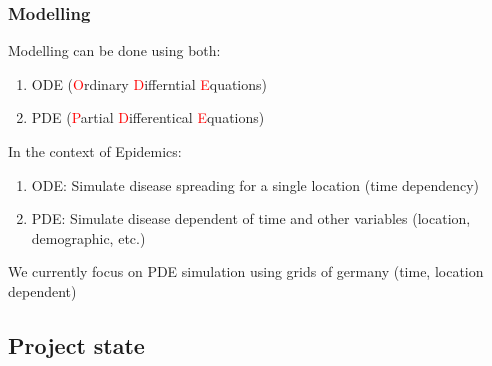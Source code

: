 \documentclass{beamer}
\begin{document}
\begin{frame}
\end{frame}

\begin{frame}
	\frametitle{Modelling}
	Modelling can be done using both:
	\begin{enumerate}[$\bullet$]
		\item ODE (\textcolor{red}{O}rdinary \textcolor{red}{D}ifferntial \textcolor{red}{E}quations)
		\item PDE (\textcolor{red}{P}artial \textcolor{red}{D}ifferentical \textcolor{red}{E}quations)
	\end{enumerate}
	\textit{ }\newline
	In the context of Epidemics:
	\begin{enumerate}[$\bullet$]
		\item ODE: Simulate disease spreading for a single location (time dependency)
		\item PDE: Simulate disease dependent of time and other variables (location, demographic, etc.) 
	\end{enumerate}
	\textit{ }\newline
	We currently focus on PDE simulation using grids of germany (time, location dependent)
\end{frame}


\subsection{Project state}
\end{document}
